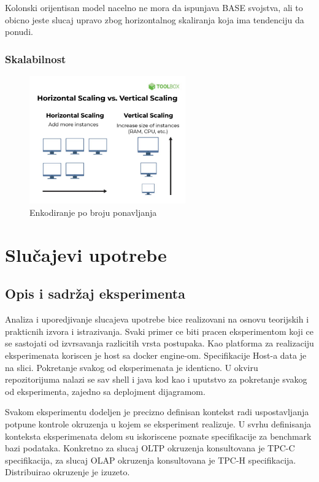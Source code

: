 \documentclass[12pt,oneside]{memoir}
\begin{document}
Kolonski orijentisan model nacelno ne mora da ispunjava BASE svojstva, ali to obicno jeste slucaj upravo zbog horizontalnog skaliranja koja ima tendenciju da ponudi.


\subsection{Skalabilnost}

\begin{figure}[!ht]
  \centering
  \includegraphics[width=0.6\textwidth]{horizontal-vertical-scaling.jpg}
  \caption{Enkodiranje po broju ponavljanja}
  \label{fig:grafikon}
\end{figure}

\chapter{Slučajevi upotrebe}
\section{Opis i sadržaj eksperimenta}
Analiza i uporedjivanje slucajeva upotrebe bice realizovani na osnovu teorijskih i prakticnih  izvora i istrazivanja. Svaki primer ce biti pracen eksperimentom koji ce se sastojati od izvrsavanja razlicitih vrsta postupaka. Kao platforma za realizaciju eksperimenata koriscen je host sa docker engine-om. Specifikacije Host-a data je na slici. Pokretanje svakog od eksperimenata je identicno. U okviru repozitorijuma nalazi se sav shell i java kod kao i uputstvo za pokretanje svakog od eksperimenta, zajedno sa deplojment dijagramom.

Svakom eksperimentu dodeljen je precizno definisan kontekst radi uspostavljanja potpune kontrole okruzenja u kojem se eksperiment realizuje. U svrhu definisanja konteksta eksperimenata delom su iskoriscene poznate specifikacije za benchmark bazi podataka. Konkretno za slucaj OLTP okruzenja konsultovana je TPC-C specifikacija, za slucaj OLAP okruzenja konsultovana je TPC-H specifikacija. Distribuirao okruzenje je izuzeto.
\end{document}
